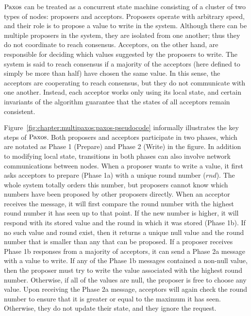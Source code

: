 $\mathrm{Paxos}$ can be treated as a concurrent state machine consisting of a cluster of two types of nodes: proposers and acceptors.
Proposers operate with arbitrary speed, and their role is to propose a value to write in the system.
Although there can be multiple proposers in the system, they are isolated from one another;
thus they do not coordinate to reach consensus.
Acceptors, on the other hand, are responsible for deciding which values suggested by the proposers to write.
The system is said to reach consensus if a majority of the acceptors (here defined to simply be more than half) have chosen the same value.
In this sense, the acceptors are cooperating to reach consensus, but they do not communicate with one another.
Instead, each acceptor works only using its local state, and certain invariants of the algorithm guarantee that the states of all acceptors remain consistent.

Figure~\ref{fig:chapter:multipaxos:paxos-pseudocode} informally illustrates the key steps of $\mathrm{Paxos}$.
Both proposers and acceptors participate in two phases, which are notated as Phase 1 (Prepare) and Phase 2 (Write) in the figure.
In addition to modifying local state, transitions in both phases can also involve network communications between nodes.
When a proposer wants to write a value, it first asks acceptors to prepare (Phase 1a) with a unique round number ($rnd$).
The whole system totally orders this number, but proposers cannot know which numbers have been proposed by other proposers directly.
When an acceptor receives the message, it will first compare the round number with the highest round number it has seen up to that point.
If the new number is higher, it will respond with its stored value and the round in which it was stored (Phase 1b).
If no such value and round exist, then it returns a unique null value and the round number that is smaller than any that can be proposed.
If a proposer receives Phase 1b responses from a majority of acceptors, it can send a Phase 2a message with a value to write.
If any of the Phase 1b messages contained a non-null value, then the proposer must try to write the value associated with the highest round number.
Otherwise, if all of the values are null, the proposer is free to choose any value.
Upon receiving the Phase 2a message, acceptors will again check the round number to ensure that it is greater or equal to the maximum it has seen.
Otherwise, they do not update their state, and they ignore the request.


